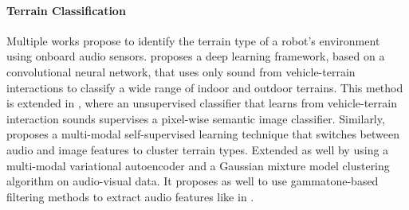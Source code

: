 \paragraph{Terrain Classification} \label{para:terrain-classification} Multiple
works propose to identify the terrain type of a robot's environment using
onboard audio sensors. \cite{Valada2018} proposes a deep learning framework,
based on a convolutional neural network, that uses only sound from
vehicle-terrain interactions to classify a wide range of indoor and outdoor
terrains. This method is extended in \cite{DeepTerrain}, where an unsupervised
classifier that learns from vehicle-terrain interaction sounds supervises a
pixel-wise semantic image classifier. Similarly, \cite{Kurobe2021} proposes a
multi-modal self-supervised learning technique that switches between audio and
image features to cluster terrain types. Extended as well by
\cite{Ishikawa2021} using a multi-modal variational autoencoder and a Gaussian
mixture model clustering algorithm on audio-visual data. It proposes as well to
use gammatone-based filtering methods to extract audio features like in
\cite{marchegiani2018a}.
